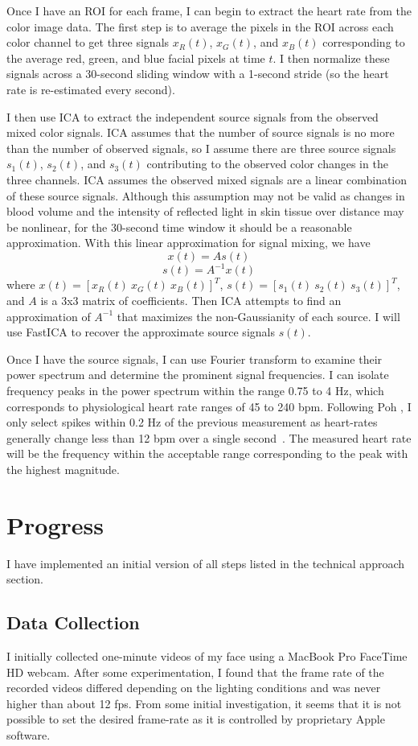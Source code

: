 \documentclass[11pt,twocolumn,letterpaper]{article}
\begin{document}
Once I have an ROI for each frame, I can begin to extract the heart rate from the color image data. The first step is to average the pixels in the ROI across each color channel to get three signals $x_R(t)$, $x_G(t)$, and $x_B(t)$ corresponding to the average red, green, and blue facial pixels at time $t$. I then normalize these signals across a 30-second sliding window with a 1-second stride (so the heart rate is re-estimated every second).

I then use ICA to extract the independent source signals from the observed mixed color signals. ICA assumes that the number of source signals is no more than the number of observed signals, so I assume there are three source signals $s_1(t)$, $s_2(t)$, and $s_3(t)$ contributing to the observed color changes in the three channels. ICA assumes the observed mixed signals are a linear combination of these source signals. Although this assumption may not be valid as changes in blood volume and the intensity of reflected light in skin tissue over distance may be nonlinear, for the 30-second time window it should be a reasonable approximation. With this linear approximation for signal mixing, we have 
	$$x(t) = As(t)$$ 
	$$s(t) = A^{-1}x(t)$$
where $x(t) = [x_R(t)\ x_G(t)\ x_B(t)]^T$, $s(t) = [s_1(t)\ s_2(t)\ s_3(t)]^T$, and $A$ is a 3x3 matrix of coefficients. Then ICA attempts to find an approximation of $A^{-1}$ that maximizes the non-Gaussianity of each source. I will use FastICA to recover the approximate source signals $s(t)$.

Once I have the source signals, I can use Fourier transform to examine their power spectrum and determine the prominent signal frequencies. I can isolate frequency peaks in the power spectrum within the range 0.75 to 4 Hz, which corresponds to physiological heart rate ranges of 45 to 240 bpm. Following Poh \etal, I only select spikes within 0.2 Hz of the previous measurement as heart-rates generally change less than 12 bpm over a single second~\cite{Poh:2010aa}. The measured heart rate will be the frequency within the acceptable range corresponding to the peak with the highest magnitude.

\section*{Progress}

I have implemented an initial version of all steps listed in the technical approach section. 

\subsection*{Data Collection}
I initially collected one-minute videos of my face using a MacBook Pro FaceTime HD webcam. After some experimentation, I found that the frame rate of the recorded videos differed depending on the lighting conditions and was never higher than about 12 fps. From some initial investigation, it seems that it is not possible to set the desired frame-rate as it is controlled by proprietary Apple software. 
\end{document}
